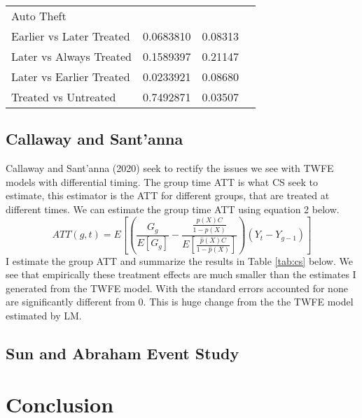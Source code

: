 \documentclass{article}
\begin{document}
\begin{table}[H]
\begin{tabular}[t]{lrrl}
\midrule
Auto Theft\\
\hspace{3mm}Earlier vs Later Treated & 0.0683810 & 0.08313\\
\hspace{3mm}Later vs Always Treated & 0.1589397 & 0.21147\\
\hspace{3mm}Later vs Earlier Treated & 0.0233921 & 0.08680\\
\hspace{3mm}Treated vs Untreated & 0.7492871 & 0.03507\\
\bottomrule
\end{tabular}
\end{table}

\subsection*{Callaway and Sant'anna}
Callaway and Sant'anna (2020) seek to rectify the issues we see with TWFE models with differential timing. The group time ATT is what CS seek to estimate, this estimator is the ATT for different groups, that are treated at different times. We can estimate the group time ATT using equation 2 below.
\begin{equation}
ATT(g,t) = E\left[\left(\frac{G_g}{E[G_g]}-\frac{\frac{\hat{p}(X)C}{1-\hat{p}(X)}}{E\left[\frac{\hat{p}(X)C}{1-\hat{p}(X)}\right]}\right)(Y_t - Y_{g-1})\right]
\end{equation}
I estimate the group ATT and summarize the results in Table \ref{tab:cs} below. We see that empirically these treatment effects are much smaller than the estimates I generated from the TWFE model. With the standard errors accounted for none are significantly different from 0. This is huge change from the the TWFE model estimated by LM.
\begin{table}[H]
\caption{Callaway Sant'anna Group ATT}
\centering
\label{tab:cs}
\end{table}
\subsection*{Sun and Abraham Event Study}
\section*{Conclusion} 
\end{document}
